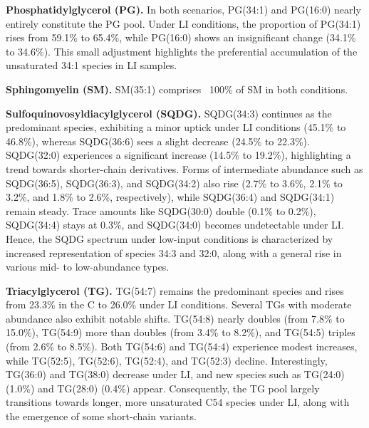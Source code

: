\documentclass[10pt,letterpaper]{article}
\begin{document}
\textbf{Phosphatidylglycerol (PG).}  
In both scenarios, PG(34:1) and PG(16:0) nearly entirely constitute the PG pool. Under LI conditions, the proportion of PG(34:1) rises from 59.1\% to 65.4\%, while PG(16:0) shows an insignificant change (34.1\% to 34.6\%). This small adjustment highlights the preferential accumulation of the unsaturated 34:1 species in LI samples.

\textbf{Sphingomyelin (SM).}  
SM(35:1) comprises ~100\% of SM in both conditions.

\textbf{Sulfoquinovosyldiacylglycerol (SQDG).}  
SQDG(34:3) continues as the predominant species, exhibiting a minor uptick under LI conditions (45.1\% to 46.8\%), whereas SQDG(36:6) sees a slight decrease (24.5\% to 22.3\%). SQDG(32:0) experiences a significant increase (14.5\% to 19.2\%), highlighting a trend towards shorter-chain derivatives. Forms of intermediate abundance such as SQDG(36:5), SQDG(36:3), and SQDG(34:2) also rise (2.7\% to 3.6\%, 2.1\% to 3.2\%, and 1.8\% to 2.6\%, respectively), while SQDG(36:4) and SQDG(34:1) remain steady. Trace amounts like SQDG(30:0) double (0.1\% to 0.2\%), SQDG(34:4) stays at 0.3\%, and SQDG(34:0) becomes undetectable under LI. Hence, the SQDG spectrum under low-input conditions is characterized by increased representation of species 34:3 and 32:0, along with a general rise in various mid- to low-abundance types.

\textbf{Triacylglycerol (TG).}  
TG(54:7) remains the predominant species and rises from 23.3\% in the C to 26.0\% under LI conditions. Several TGs with moderate abundance also exhibit notable shifts. TG(54:8) nearly doubles (from 7.8\% to 15.0\%), TG(54:9) more than doubles (from 3.4\% to 8.2\%), and TG(54:5) triples (from 2.6\% to 8.5\%). Both TG(54:6) and TG(54:4) experience modest increases, while TG(52:5), TG(52:6), TG(52:4), and TG(52:3) decline. Interestingly, TG(36:0) and TG(38:0) decrease under LI, and new species such as TG(24:0) (1.0\%) and TG(28:0) (0.4\%) appear. Consequently, the TG pool largely transitions towards longer, more unsaturated C54 species under LI, along with the emergence of some short-chain variants.

\bigskip
\end{document}
